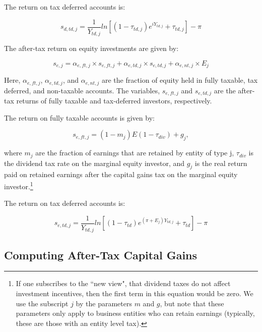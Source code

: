 \documentclass[article,11pt,letterpaper,fleqn]{article}
\theoremstyle{definition}
\numberwithin{equation}{section}
\begin{document}
 The return on tax deferred accounts is:
 
 \begin{equation}
s_{d,td,j} = \frac{1}{Y_{td,j}}ln \left[(1-\tau_{td,j})e^{iY_{td,j}}+\tau_{td,j}\right]-\pi
\end{equation}


The after-tax return on equity investments are given by:

\begin{equation}
s_{e,j} = \alpha_{e,ft,j}\times s_{e,ft,j} + \alpha_{e,td,j}\times s_{e,td,j} + \alpha_{e,nt,j}\times E_{j}
\end{equation}

 

Here, $\alpha_{e,ft,j}$, $\alpha_{e,td,j}$, and $\alpha_{e,nt,j}$ are the fraction of equity held in fully taxable, tax deferred, and non-taxable accounts.  The variables, $s_{e,ft,j}$ and $s_{e,td,j}$ are the after-tax returns of fully taxable and tax-deferred investors, respectively.  

The return on fully taxable accounts is given by:

\begin{equation}
s_{e,ft,j} = (1-m_{j})E(1-\tau_{div}) + g_{j},
\end{equation}

\noindent\noindent where $m_{j}$ are the fraction of earnings that are retained by entity of type j, $\tau_{div}$ is the dividend tax rate on the marginal equity investor, and $g_{j}$ is the real return paid on retained earnings after the capital gains tax on the marginal equity investor.\footnote{If one subscribes to the ``new view", that dividend taxes do not affect investment incentives, then the first term in this equation would be zero.  We use the subscript $j$ by the parameters $m$ and $g$, but note that these parameters only apply to business entities who can retain earnings (typically, these are those with an entity level tax).}
 
 The return on tax deferred accounts is:
 
 \begin{equation}
s_{e,td,j} = \frac{1}{Y_{td,j}}ln \left[(1-\tau_{td})e^{(\pi+E_{j})Y_{td,j}}+\tau_{td}\right]-\pi
\end{equation}
 

\subsection{Computing After-Tax Capital Gains}
\end{document}
